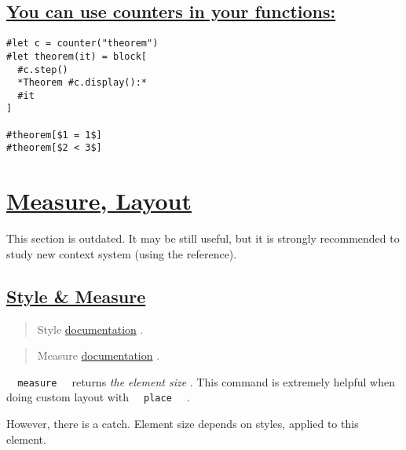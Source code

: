 \pandocbounded{}

\subsection{\texorpdfstring{\hyperref[you-can-use-counters-in-your-functions]{You
can use counters in your
functions:}}{You can use counters in your functions:}}\label{you-can-use-counters-in-your-functions}

\begin{verbatim}
#let c = counter("theorem")
#let theorem(it) = block[
  #c.step()
  *Theorem #c.display():*
  #it
]

#theorem[$1 = 1$]
#theorem[$2 < 3$]
\end{verbatim}

\pandocbounded{}

\section{\texorpdfstring{\hyperref[measure-layout]{Measure,
Layout}}{Measure, Layout}}\label{measure-layout}

This section is outdated. It may be still useful, but it is strongly
recommended to study new context system (using the reference).

\subsection{\texorpdfstring{\hyperref[style--measure]{Style \&
Measure}}{Style \& Measure}}\label{style--measure}

\begin{quote}
Style
\href{https://typst.app/docs/reference/foundations/style/}{documentation}
.
\end{quote}

\begin{quote}
Measure
\href{https://typst.app/docs/reference/layout/measure/}{documentation} .
\end{quote}

\texttt{\ }{\texttt{\ measure\ }}\texttt{\ } returns \emph{the element
size} . This command is extremely helpful when doing custom layout with
\texttt{\ }{\texttt{\ place\ }}\texttt{\ } .

However, there is a catch. Element size depends on styles, applied to
this element.

